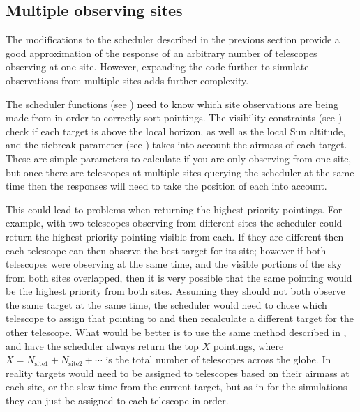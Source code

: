 \subsection{Multiple observing sites}
\label{sec:multi_site_scheduling}
\begin{colsection}

The modifications to the scheduler described in the previous section provide a good approximation of the response of an arbitrary number of telescopes observing at one site. However, expanding the code further to simulate observations from multiple sites adds further complexity.

The scheduler functions (see ) need to know which site observations are being made from in order to correctly sort pointings. The visibility constraints (see ) check if each target is above the local horizon, as well as the local Sun altitude, and the tiebreak parameter (see ) takes into account the airmass of each target. These are simple parameters to calculate if you are only observing from one site, but once there are telescopes at multiple sites querying the scheduler at the same time then the responses will need to take the position of each into account.

This could lead to problems when returning the highest priority pointings. For example, with two telescopes observing from different sites the scheduler could return the highest priority pointing visible from each. If they are different then each telescope can then observe the best target for its site; however if both telescopes were observing at the same time, and the visible portions of the sky from both sites overlapped, then it is very possible that the same pointing would be the highest priority from both sites. Assuming they should not both observe the same target at the same time, the scheduler would need to chose which telescope to assign that pointing to and then recalculate a different target for the other telescope. What would be better is to use the same method described in , and have the scheduler always return the top $X$ pointings, where $X = N_\text{site1} + N_\text{site2} + \cdots$ is the total number of telescopes across the globe. In reality targets would need to be assigned to telescopes based on their airmass at each site, or the slew time from the current target, but as in  for the simulations they can just be assigned to each telescope in order.


\end{colsection}
